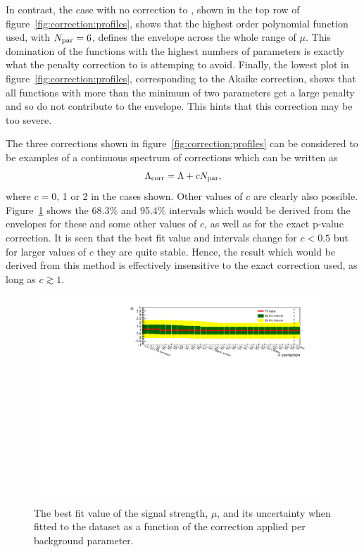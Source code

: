 In contrast, the case with no correction to \nll, shown in the top row of
figure~\ref{fig:correction:profiles}, shows that the highest order polynomial
function used, with $N_{\rm par}=6$, defines the envelope across the whole
range of $\mu$. This domination of the functions with the highest numbers of
parameters is exactly what the penalty correction to \nll is attemping to
avoid. Finally, the lowest plot in figure~\ref{fig:correction:profiles},
corresponding to the Akaike correction, shows that all functions with more
than the minimum of two parameters get a large penalty and so do not
contribute to the envelope. This hints that this correction may be too severe.

The three corrections shown in figure~\ref{fig:correction:profiles} can be
considered to be examples of a continuous spectrum of corrections which can
be written as
\begin{displaymath}
\Lambda_{\mathrm{corr}} = \textrm{\ensuremath{\Lambda}} + cN_{\rm par},
\end{displaymath}
where $c=0$, 1 or 2 in the cases shown. Other values of $c$ are clearly
also possible.
Figure~\ref{fig:correction:correction} shows the
68.3\% and 95.4\% intervals which would be derived from the envelopes
for these and
some other values of $c$, as well as for the exact p-value correction.
It is seen that the best fit value and intervals change for $c<0.5$ but
for larger values of $c$ they are quite stable. Hence, the result which would
be derived from this method is effectively insensitive to the exact correction
used, as long as $c \gtrsim 1$.
%
\begin{figure}[htp]
\centering
\includegraphics[width=0.98\textwidth]{correction/correction.pdf}
\caption{The best fit value of the signal strength, $\mu$, and its uncertainty when fitted to the dataset as a function of the correction applied per background parameter.}
\label{fig:correction:correction}
\end{figure}


